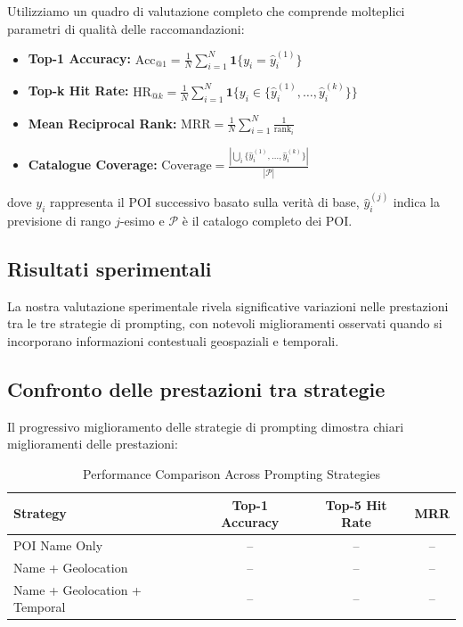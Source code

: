 Utilizziamo un quadro di valutazione completo che comprende molteplici parametri di qualità delle raccomandazioni:

\begin{itemize}
\item \textbf{Top-1 Accuracy:} $\text{Acc}_{@1} = \frac{1}{N}\sum_{i=1}^{N}\mathbf{1}\{y_i = \hat{y}_i^{(1)}\}$
\item \textbf{Top-k Hit Rate:} $\text{HR}_{@k} = \frac{1}{N}\sum_{i=1}^{N}\mathbf{1}\{y_i \in \{\hat{y}_i^{(1)}, \ldots, \hat{y}_i^{(k)}\}\}$
\item \textbf{Mean Reciprocal Rank:} $\text{MRR} = \frac{1}{N}\sum_{i=1}^{N}\frac{1}{\text{rank}_i}$
\item \textbf{Catalogue Coverage:} $\text{Coverage} = \frac{|\bigcup_{i}\{\hat{y}_i^{(1)}, \ldots, \hat{y}_i^{(k)}\}|}{|\mathcal{P}|}$
\end{itemize}

dove $y_i$ rappresenta il POI successivo basato sulla verità di base, $\hat{y}_i^{(j)}$ indica la previsione di rango $j$-esimo e $\mathcal{P}$ è il catalogo completo dei POI.

\subsection{Risultati sperimentali}

La nostra valutazione sperimentale rivela significative variazioni nelle prestazioni tra le tre strategie di prompting, con notevoli miglioramenti osservati quando si incorporano informazioni contestuali geospaziali e temporali.

\subsection{Confronto delle prestazioni tra strategie}

Il progressivo miglioramento delle strategie di prompting dimostra chiari miglioramenti delle prestazioni:

\begin{table}[h]
\centering
\caption{Performance Comparison Across Prompting Strategies}
\label{tab:strategy_comparison}
\begin{tabular}{lccc}
\toprule
\textbf{Strategy} & \textbf{Top-1 Accuracy} & \textbf{Top-5 Hit Rate} & \textbf{MRR} \\
\midrule
POI Name Only & -- & -- & -- \\
Name + Geolocation & -- & -- & -- \\
Name + Geolocation + Temporal & -- & -- & -- \\
\bottomrule
\end{tabular}
\end{table}

